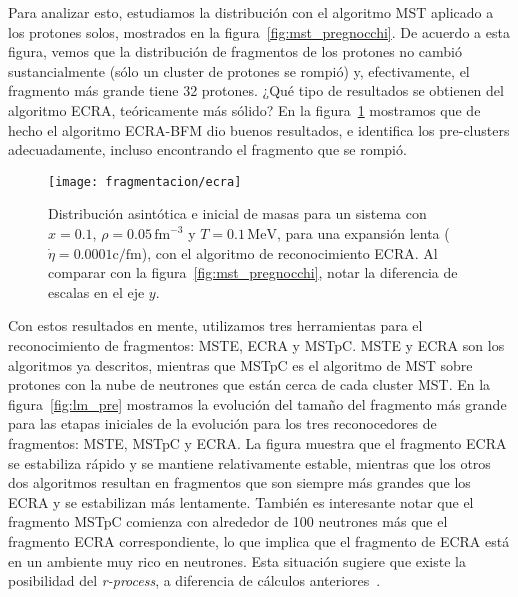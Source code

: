 Para analizar esto, estudiamos la distribución con el algoritmo MST aplicado a los protones solos, mostrados en la figura~\ref{fig:mst_pregnocchi}.
De acuerdo a esta figura, vemos que la distribución de fragmentos de los protones no cambió sustancialmente (sólo un cluster de protones se rompió) y, efectivamente, el fragmento más grande tiene 32 protones.
¿Qué tipo de resultados se obtienen del algoritmo ECRA, teóricamente más sólido?
En la figura~\ref{fig:ecra_pregnocchi} mostramos que de hecho el algoritmo ECRA-BFM dio buenos resultados, e identifica los pre-clusters adecuadamente, incluso encontrando el fragmento que se rompió.

\begin{figure}
  \texttt{[image: fragmentacion/ecra]}
  \caption{Distribución asintótica e inicial de masas para un sistema con $x = 0.1$, $\rho = 0.05\,\text{fm}^{-3}$ y $T = 0.1\,\text{MeV}$, para una expansión lenta ($\dot{\eta} = 0.0001\text{c/fm}$), con el algoritmo de reconocimiento ECRA. Al comparar con la figura~\ref{fig:mst_pregnocchi}, notar la diferencia de escalas en el eje $y$.}
\label{fig:ecra_pregnocchi}
\end{figure}

Con estos resultados en mente, utilizamos tres herramientas para el reconocimiento de fragmentos: MSTE, ECRA y MSTpC.
MSTE y ECRA son los algoritmos ya descritos, mientras que MSTpC es el algoritmo de MST sobre protones con la nube de neutrones que están cerca de cada cluster MST.\@
En la figura~\ref{fig:lm_pre} mostramos la evolución del tamaño del fragmento más grande para las etapas iniciales de la evolución para los tres reconocedores de fragmentos: MSTE, MSTpC y ECRA.\@
La figura muestra que el fragmento ECRA se estabiliza rápido y se mantiene relativamente estable, mientras que los otros dos algoritmos resultan en fragmentos que son siempre más grandes que los ECRA y se estabilizan más lentamente.
También es interesante notar que el fragmento MSTpC comienza con alrededor de 100 neutrones más que el fragmento ECRA correspondiente, lo que implica que el fragmento de ECRA está en un ambiente muy rico en neutrones.
Esta situación sugiere que existe la posibilidad del \emph{r-process}, a diferencia de cálculos anteriores~\cite{caplan_pasta_2015}.

